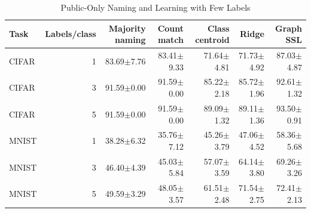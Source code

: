 \begin{table}[t]
\caption{Public-Only Naming and Learning with Few Labels}
\label{tab:fewshot}\small
\centering
\begin{tabular}{@{}lrrrrrr@{}}\toprule
Task & Labels/class & Majority naming & Count match & Class centroid & Ridge & Graph SSL \\
\midrule
CIFAR & 1 & 83.69$\pm$7.76 & 83.41$\pm$9.33 & 71.64$\pm$4.81 & 71.73$\pm$4.92 & 87.03$\pm$4.87 \\
CIFAR & 3 & 91.59$\pm$0.00 & 91.59$\pm$0.00 & 85.22$\pm$2.18 & 85.72$\pm$1.96 & 92.61$\pm$1.32 \\
CIFAR & 5 & 91.59$\pm$0.00 & 91.59$\pm$0.00 & 89.09$\pm$1.32 & 89.11$\pm$1.36 & 93.50$\pm$0.91 \\
MNIST & 1 & 38.28$\pm$6.32 & 35.76$\pm$7.12 & 45.26$\pm$3.79 & 47.06$\pm$4.52 & 58.36$\pm$5.68 \\
MNIST & 3 & 46.40$\pm$4.39 & 45.03$\pm$5.84 & 57.07$\pm$3.59 & 64.14$\pm$3.80 & 69.26$\pm$3.26 \\
MNIST & 5 & 49.59$\pm$3.29 & 48.05$\pm$3.57 & 61.51$\pm$2.48 & 71.54$\pm$2.75 & 72.41$\pm$2.13 \\
\bottomrule\end{tabular}
\end{table}
